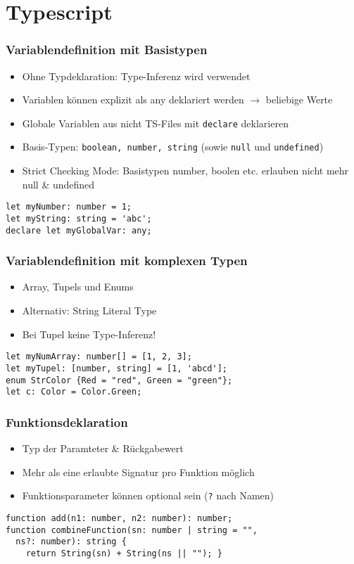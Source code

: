
\section{Typescript}
\subsubsection{Variablendefinition mit Basistypen}
\begin{itemize}
    \item Ohne Typdeklaration: Type-Inferenz wird verwendet
    \item Variablen können explizit als any deklariert werden $\rightarrow$ beliebige Werte
    \item Globale Variablen aus nicht TS-Files mit \texttt{declare} deklarieren
    \item Basis-Typen: \texttt{boolean, number, string} (sowie \texttt{null} und \texttt{undefined})
    \item Strict Checking Mode: Basistypen number, boolen etc. erlauben nicht mehr null \& undefined
\end{itemize}
\begin{lstlisting}
let myNumber: number = 1;
let myString: string = 'abc';
declare let myGlobalVar: any;
\end{lstlisting}

\subsubsection{Variablendefinition mit komplexen Typen}
\begin{itemize}
    \item Array, Tupels und Enums
    \item Alternativ: String Literal Type
    \item Bei Tupel keine Type-Inferenz!
\end{itemize}
\begin{lstlisting}
let myNumArray: number[] = [1, 2, 3];
let myTupel: [number, string] = [1, 'abcd'];
enum StrColor {Red = "red", Green = "green"};
let c: Color = Color.Green;
\end{lstlisting}

\subsubsection{Funktionsdeklaration}
\begin{itemize}
    \item Typ der Paramteter \& Rückgabewert
    \item Mehr als eine erlaubte Signatur pro Funktion möglich
    \item Funktionsparameter können optional sein (\texttt{?} nach Namen)
\end{itemize}
\begin{lstlisting}
function add(n1: number, n2: number): number;
function combineFunction(sn: number | string = "",
  ns?: number): string {
    return String(sn) + String(ns || ""); }
\end{lstlisting}

